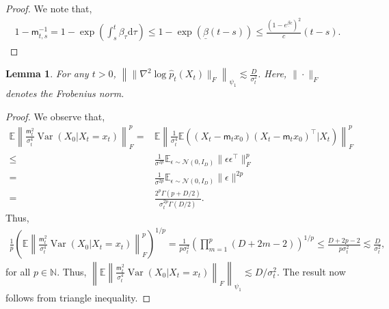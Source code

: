 \documentclass[12pts]{article}
\newtheorem{lemma}[defn]{Lemma}%
\newcommand{\diff}{\mathrm{d}}
\newcommand{\cN}{ \mathcal{N}}
\newcommand{\E}{\mathbb{E}}
\newcommand{\fN}{\mathbb{N}}
\newcommand{\hp}{\hat{p}}
\begin{document}
\begin{proof}
    We note that, 
    \begin{align*}
        1-\mathsf{m}_{t,s}^{-1} = 1 - \exp\left( \int_s^t \beta_\tau \diff \tau\right) \le 1 - \exp(\underline{\beta} (t-s)) \le \frac{(1-e^{\underline{\beta} c})^2}{c} (t-s).
    \end{align*}
\end{proof}
\begin{lemma}
For any $t>0$,    $\left\|\|\nabla^2 \log \hp_t(X_t)\|_{F}\right\|_{\psi_1} \lesssim \frac{D}{\sigma_t^2}$. Here, $\|\cdot\|_F$ denotes the Frobenius norm.
\end{lemma}
\begin{proof}
   We observe that,
\begingroup
\allowdisplaybreaks
\begin{align*}
    \E \left\|\frac{\mathsf{m}_t ^2 }{\sigma_t^4} \operatorname{Var}\left(X_0 \big| X_t =x_t\right) \right\|_F^p = & \E \left\|\frac{1}{\sigma_t^4}\E \left((X_t- \mathsf{m}_t x_0)(X_t- \mathsf{m}_t x_0)^\top \big| X_t\right)\right\|_F^p\\
    \le & \frac{1}{\sigma^{2p}} \E_{\epsilon \sim \cN(0,I_D)} \|\epsilon \epsilon^\top\|_F^p\\
    = & \frac{1}{\sigma^{2p}} \E_{\epsilon \sim \cN(0,I_D)} \|\epsilon \|^{2p}\\
    = & \frac{2^p \Gamma(p + D/2)}{\sigma_t^{2p}\Gamma(D/2)}.
\end{align*}
\endgroup
Thus,
\begin{align*}
    \frac{1}{p} \left(\E \left\|\frac{\mathsf{m}_t ^2 }{\sigma_t^4} \operatorname{Var}\left(X_0 \big| X_t =x_t\right) \right\|_F^p\right)^{1/p} = \frac{1}{p \sigma_t^2} \left(\prod_{m=1}^p (D + 2 m - 2)\right)^{1/p} \le \frac{D+ 2p - 2}{p \sigma_t^2} \lesssim \frac{D}{\sigma_t^2}, 
\end{align*}
for all $p \in \fN$. Thus, $\left\|\E \left\|\frac{\mathsf{m}_t ^2 }{\sigma_t^4} \operatorname{Var}\left(X_0 \big| X_t =x_t\right) \right\|_F\right\|_{\psi_1} \lesssim D/\sigma_t^2$. The result now follows from triangle inequality. 
\end{proof}
\end{document}
